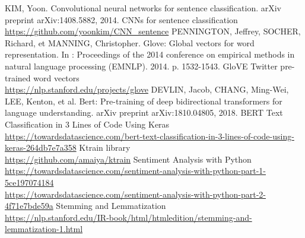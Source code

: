 \documentclass[11pt, a4paper, twocolumn]{article}
\begin{document}
\clearpage
\onecolumn

\begin{thebibliography}{9}
		KIM, Yoon. Convolutional neural networks for sentence classification. arXiv preprint arXiv:1408.5882, 2014.
		CNNs for sentence classification
		\\\url{https://github.com/yoonkim/CNN\_sentence}
		PENNINGTON, Jeffrey, SOCHER, Richard, et MANNING, Christopher. Glove: Global vectors for word representation. In : Proceedings of the 2014 conference on empirical methods in natural language processing (EMNLP). 2014. p. 1532-1543.
		GloVE Twitter pre-trained word vectors
		\\\url{https://nlp.stanford.edu/projects/glove}
		DEVLIN, Jacob, CHANG, Ming-Wei, LEE, Kenton, et al. Bert: Pre-training of deep bidirectional transformers for language understanding. arXiv preprint arXiv:1810.04805, 2018.
		BERT Text Classification in 3 Lines of Code Using Keras
		\\\url{https://towardsdatascience.com/bert-text-classification-in-3-lines-of-code-using-keras-264db7e7a358}
		Ktrain library
		\\\url{https://github.com/amaiya/ktrain}
		Sentiment Analysis with Python
		\\\url{https://towardsdatascience.com/sentiment-analysis-with-python-part-1-5ce197074184}
		\\\url{https://towardsdatascience.com/sentiment-analysis-with-python-part-2-4f71e7bde59a}
		Stemming and Lemmatization
		\\\url{https://nlp.stanford.edu/IR-book/html/htmledition/stemming-and-lemmatization-1.html}

\end{thebibliography}
\end{document}
